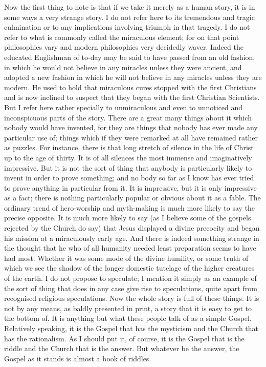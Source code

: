 Now the first thing to note is that if we take it merely as a human story, it is in some ways a very strange story. I do not refer here to its tremendous and tragic culmination or to any implications involving triumph in that tragedy. I do not refer to what is commonly called the miraculous element; for on that point philosophies vary and modern philosophies very decidedly waver. Indeed the educated Englishman of to-day may be said to have passed from an old fashion, in which he would not believe in any miracles unless they were ancient, and adopted a new fashion in which he will not believe in any miracles unless they are modern. He used to hold that miraculous cures stopped with the first Christians and is now inclined to suspect that they began with the first Christian Scientists. But I refer here rather specially to unmiraculous and even to unnoticed and inconspicuous parts of the story. There are a great many things about it which nobody would have invented, for they are things that nobody has ever made any particular use of; things which if they were remarked at all have remained rather as puzzles. For instance, there is that long stretch of silence in the life of Christ up to the age of thirty. It is of all silences the most immense and imaginatively impressive. But it is not the sort of thing that anybody is particularly likely to invent in order to prove something; and no body so far as I know has ever tried to prove anything in particular from it. It is impressive, but it is only impressive as a fact; there is nothing particularly popular or obvious about it as a fable. The ordinary trend of hero-worship and myth-making is much more likely to say the precise opposite. It is much more likely to say (as I believe some of the gospels rejected by the Church do say) that Jesus displayed a divine precocity and began his mission at a miraculously early age. And there is indeed something strange in the thought that he who of all humanity needed least preparation seems to have had most. Whether it was some mode of the divine humility, or some truth of which we see the shadow of the longer domestic tutelage of the higher creatures of the earth. I do not propose to speculate; I mention it simply as an example of the sort of thing that does in any case give rise to speculations, quite apart from recognised religious speculations. Now the whole story is full of these things. It is not by any means, as baldly presented in print, a story that it is easy to get to the bottom of. It is anything but what these people talk of as a simple Gospel. Relatively speaking, it is the Gospel that has the mysticism and the Church that has the rationalism. As I should put it, of course, it is the Gospel that is the riddle and the Church that is the answer. But whatever be the answer, the Gospel as it stands is almost a book of riddles.

